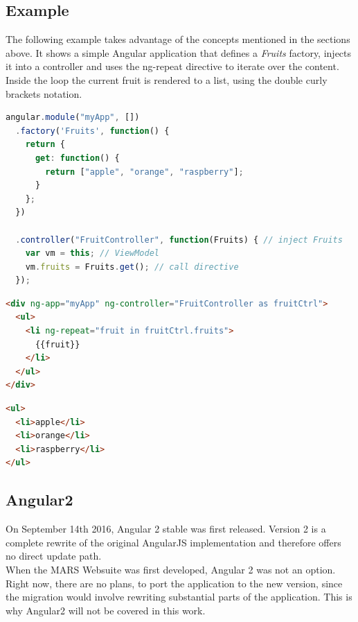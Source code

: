 \subsection{Example}
The following example takes advantage of the concepts mentioned in the sections above. It shows a simple Angular application that defines a \textit{Fruits} factory, injects it into a controller and uses the ng-repeat directive to iterate over the content. Inside the loop the current fruit is rendered to a list, using the double curly brackets notation.

\begin{lstlisting}[language=javascript, caption=AngularJS directive and controller definition, label=lst:angular]
angular.module("myApp", [])
  .factory('Fruits', function() {
    return {
      get: function() {
        return ["apple", "orange", "raspberry"];
      }
    };
  })
  
  .controller("FruitController", function(Fruits) { // inject Fruits
    var vm = this; // ViewModel
    vm.fruits = Fruits.get(); // call directive
  });
\end{lstlisting}

\begin{lstlisting}[language=html, caption=AngularJS template]
<div ng-app="myApp" ng-controller="FruitController as fruitCtrl">
  <ul>
    <li ng-repeat="fruit in fruitCtrl.fruits">
      {{fruit}}
    </li>
  </ul>
</div>
\end{lstlisting}

\begin{lstlisting}[language=html, caption=HTML result]
<ul>
  <li>apple</li>
  <li>orange</li>
  <li>raspberry</li>
</ul>
\end{lstlisting}


\subsection{Angular2}
On September 14th 2016, Angular 2 stable was first released. Version 2 is a complete rewrite of the original AngularJS implementation and therefore offers no direct update path.\\
When the MARS Websuite was first developed, Angular 2 was not an option. Right now, there are no plans, to port the application to the new version, since the migration would involve rewriting substantial parts of the application. This is why Angular2 will not be covered in this work.
